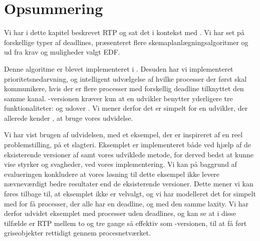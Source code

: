 \section{Opsummering}
Vi har i dette kapitel beskrevet RTP og sat det i kontekst med \pycsp. Vi har set på forskellige typer af deadlines, præsenteret flere skemaplanlægningsalgoritmer og ud fra krav og muligheder valgt EDF. 

Denne algoritme er blevet implementeret i \pycsp. Desuden har vi implementeret prioritetsnedarvning, og intelligent udvælgelse af hvilke processer der først skal kommunikere, hvis der er flere processer med forskellig deadline tilknyttet den samme kanal. -versionen kræver kun at en udvikler benytter yderligere tre funktionaliteter:  og  udover \pycsp. Vi mener derfor det er simpelt for en udvikler, der allerede kender \pycsp, at bruge vores udvidelse.

Vi har vist brugen af udvidelsen, med et eksempel,  der er inspireret af en reel problemstilling, på et slagteri. Eksemplet er implementeret både ved hjælp af de eksisterende versioner af \pycsp  samt vores udviklede metode, for derved bedst at kunne vise styrker og svagheder, ved vores implementering. Vi kan på baggrund af evalueringen konkludere at vores løsning til dette eksempel ikke levere nævneværdigt bedre resultater end de eksisterende versioner. 
Dette mener vi kan føres tilbage til, at eksemplet ikke er velvalgt, og vi har modelleret det for simpelt med for få processer, der alle har en deadline, og med den samme laxity. Vi har derfor udvidet eksemplet med processer uden deadlines, og kan se at i disse tilfælde er RTP mellem to og tre gange så effektiv som -versionen, til at få ført griseobjekter rettidigt gennem procesnetværket.  






